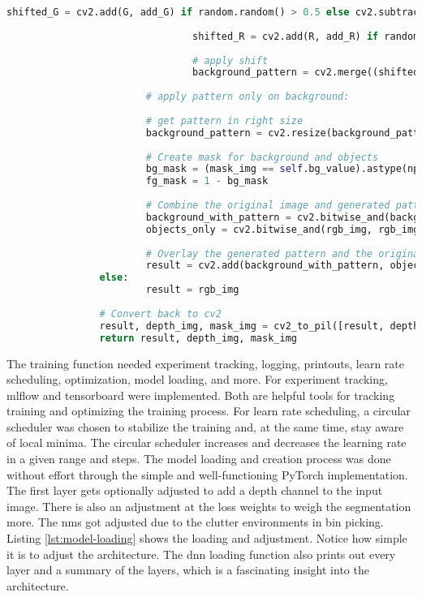 \begin{lstlisting}[language=Python,caption=Random Augmentation of the Background using cv2 in Python, label=lst:bg-augmentation]
								shifted_G = cv2.add(G, add_G) if random.random() > 0.5 else cv2.subtract(G, add_G)
								
								shifted_R = cv2.add(R, add_R) if random.random() > 0.5 else cv2.subtract(R, add_R)
								
								# apply shift
								background_pattern = cv2.merge((shifted_B, shifted_G, shifted_R))
								
						# apply pattern only on background:
						
						# get pattern in right size
						background_pattern = cv2.resize(background_pattern, (rgb_img.shape[1], rgb_img.shape[0]))
						
						# Create mask for background and objects
						bg_mask = (mask_img == self.bg_value).astype(np.uint8)
						fg_mask = 1 - bg_mask
						
						# Combine the original image and generated pattern
						background_with_pattern = cv2.bitwise_and(background_pattern, background_pattern, mask=bg_mask)
						objects_only = cv2.bitwise_and(rgb_img, rgb_img, mask=fg_mask)
						
						# Overlay the generated pattern and the original objects
						result = cv2.add(background_with_pattern, objects_only)
				else:
						result = rgb_img
				
				# Convert back to cv2
				result, depth_img, mask_img = cv2_to_pil([result, depth_img, mask_img])
				return result, depth_img, mask_img
		\end{lstlisting}
		
		The training function needed experiment tracking, logging, printouts, learn rate scheduling, optimization, model loading, and more. For experiment tracking, mlflow and tensorboard were implemented. Both are helpful tools for tracking training and optimizing the training process. For learn rate scheduling, a circular scheduler was chosen to stabilize the training and, at the same time, stay aware of local minima. The circular scheduler increases and decreases the learning rate in a given range and steps. The model loading and creation process was done without effort through the simple and well-functioning PyTorch implementation. The first layer gets optionally adjusted to add a depth channel to the input image. There is also an adjustment at the loss weights to weigh the segmentation more. The \acl{nms} got adjusted due to the clutter environments in bin picking. Listing \ref{lst:model-loading} shows the loading and adjustment. Notice how simple it is to adjust the architecture. The \ac{dnn} loading function also prints out every layer and a summary of the layers, which is a fascinating insight into the architecture.
		
